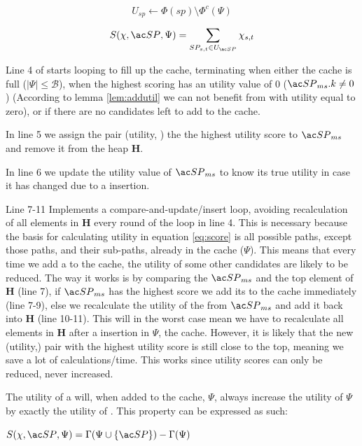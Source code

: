 \begin{equation} \label{eq:usp}
U_{sp} \leftarrow \Phi(sp) \setminus \Phi^c(\Psi)
\end{equation}

\begin{equation} \label{eq:score}
S(\chi, \spath, \Psi) = \sum\limits_{SP_{s,t} \in U_{\spath}} \chi_{s,t}
\end{equation}


Line 4 of \salgo starts looping to fill up the cache, terminating when either the cache is full ($| \Psi | \leq  \mathcal{B}$), when the highest scoring \spath has an utility value of 0 ($\spath_{ms}.k \neq 0$) (According to lemma \ref{lem:addutil} we can not benefit from \spaths with utility equal to zero), or if there are no \spath candidates left to add to the cache.

In line 5 we assign the pair (utility, \spath) the the highest utility score to $\spath_{ms}$ and remove it from the heap \textbf{H}.

In line 6 we update the utility value of $\spath_{ms}$ to know its true utility in case it has changed due to a \spath insertion.

Line 7-11 Implements a compare-and-update/insert loop, avoiding recalculation of all elements in \textbf{H} every round of the loop in line 4. This is necessary because the basis for calculating utility in equation \ref{eq:score} is all possible paths, except those paths, and their sub-paths, already in the cache ($\Psi$). This means that every time we add a \spath to the cache, the utility of some other candidates are likely to be reduced. The way it works is by comparing the $\spath_{ms}$ and the top element of \textbf{H} (line 7), if $\spath_{ms}$ has the highest score we add its \spath to the cache immediately (line 7-9), else we recalculate the utility of the \spath from $\spath_{ms}$ and add it back into \textbf{H} (line 10-11). This will in the worst case mean we have to recalculate all elements in \textbf{H} after a \spath insertion in $\Psi$, the cache. However, it is likely that the new (utility,\spath) pair with the highest utility score is still close to the top, meaning we save a lot of calculations/time. This works since utility scores can only be reduced, never increased.


\begin{lemma}\label{lem:addutil}
The utility of a \spath will, when added to the cache, $\Psi$, always increase the utility of $\Psi$ by exactly the utility of \spath. This property can be expressed as such:

$S(\chi, \spath, \Psi) = \Gamma(\Psi \cup \{\spath\}) - \Gamma(\Psi)$

\end{lemma}

